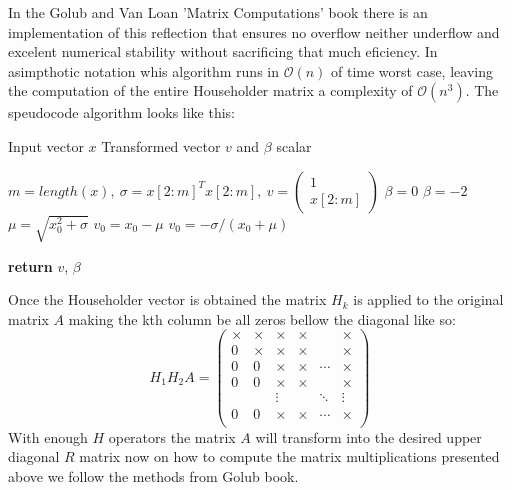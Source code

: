 \documentclass{scrartcl}
\begin{document}
  In the Golub and Van Loan 'Matrix Computations' book there is an implementation of this reflection that ensures no overflow neither underflow and excelent numerical stability without sacrificing that much eficiency. In asimpthotic notation whis algorithm runs in $\mathcal{O}(n)$ of time worst case, leaving the computation of the entire Householder matrix a complexity of $\mathcal{O}(n^3)$. The speudocode algorithm looks like this:

\begin{algorithm}[H]
    \caption{Householder reflection algorithm from `Matrix Computations'}
    \label{alg:householder_reflection}
    \begin{algorithmic}[0]
        \REQUIRE Input vector $x$
        \ENSURE Transformed vector $v$ and $\beta$ scalar

        \STATE $m = length(x),\ \sigma = x[2:m]^T x[2:m],\ v = \begin{pmatrix} 1 \\ x[2:m] \end{pmatrix}$
            \STATE $\beta = 0$
            \STATE $\beta = -2$
        \ELSE
            \STATE $\mu = \sqrt{x_0^2 + \sigma}$
                \STATE $v_0 = x_0 - \mu$
            \ELSE
                \STATE $v_0 = -\sigma / (x_0 + \mu)$
            \ENDIF
        \ENDIF

        \STATE \textbf{return} $v$, $\beta$
    \end{algorithmic}
\end{algorithm}

Once the Householder vector is obtained the matrix $H_k$ is applied to the original matrix $A$ making the kth column be all zeros bellow the diagonal like so:
\[ 
    H_1 H_2 A = \begin{pmatrix}
   \times & \times     & \times & \times & & \times \\
        0 &     \times & \times & \times & & \times \\
        0 & 0 & \times & \times & \cdots & \times \\
        0 & 0 & \times & \times &        & \times \\
          &   & \vdots &        & \ddots & \vdots \\
        0 & 0 & \times & \times & \cdots & \times \\
                \end{pmatrix}
\]
With enough $H$ operators the matrix $A$ will transform into the desired upper diagonal $R$ matrix now on how to compute the matrix multiplications presented above we follow the methods from Golub book.
\end{document}
